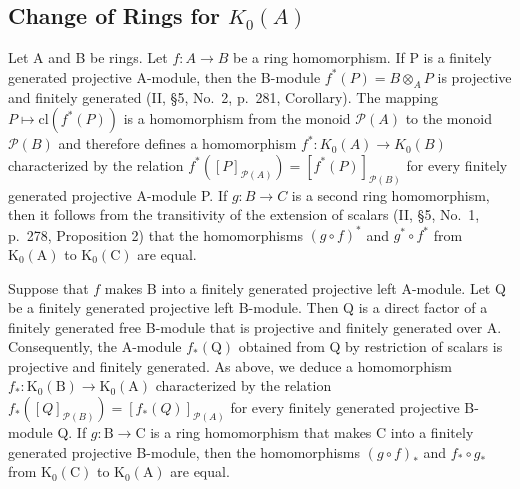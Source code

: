 \subsection{\texorpdfstring{Change of Rings for \(K_{0}(A)\)}{Change of Rings for K\_\{0\}(A)}}

Let A and B be rings. Let \(f: A \to B\) be a ring homomorphism. If P is a finitely generated projective A-module, then the B-module \(f^{*}(P) = B \otimes_{A} P\) is projective and finitely generated (II, §5, No.~2, p.~281, Corollary). The mapping \(P \mapsto \text{cl}(f^{*}(P))\) is a homomorphism from the monoid \(\mathcal{P}(A)\) to the monoid \(\mathcal{P}(B)\) and therefore defines a homomorphism \(f^{*}: K_{0}(A) \to K_{0}(B)\) characterized by the relation \(f^{*}([P]_{\mathcal{P}(A)}) = [f^{*}(P)]_{\mathcal{P}(B)}\) for every finitely generated projective A-module P. If \(g: B \to C\) is a second ring homomorphism, then it follows from the transitivity of the extension of scalars (II, §5, No.~1, p.~278, Proposition 2) that the homomorphisms \((g \circ f)^*\) and \(g^{*} \circ f^{*}\) from \(\mathrm{K}_{0}(\mathrm{A})\) to \(\mathrm{K}_{0}(\mathrm{C})\) are equal.

Suppose that \(f\) makes B into a finitely generated projective left A-module. Let Q be a finitely generated projective left B-module. Then Q is a direct factor of a finitely generated free B-module that is projective and finitely generated over A. Consequently, the A-module \(f_{*}(\mathrm{Q})\) obtained from Q by restriction of scalars is projective and finitely generated. As above, we deduce a homomorphism \(f_{*}: \mathrm{K}_{0}(\mathrm{B}) \to \mathrm{K}_{0}(\mathrm{A})\) characterized by the relation \(f_{*}([Q]_{\mathcal{P}(B)}) = [f_{*}(Q)]_{\mathcal{P}(A)}\) for every finitely generated projective B-module Q. If \(g: \mathrm{B} \to \mathrm{C}\) is a ring homomorphism that makes C into a finitely generated projective B-module, then the homomorphisms \((g \circ f)_{*}\) and \(f_{*} \circ g_{*}\) from \(\mathrm{K}_{0}(\mathrm{C})\) to \(\mathrm{K}_{0}(\mathrm{A})\) are equal.

